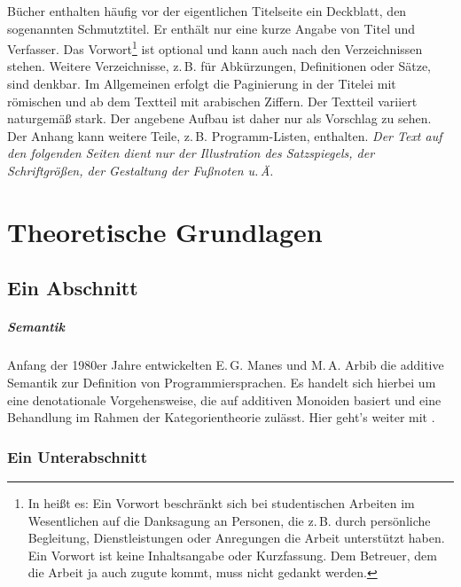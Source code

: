 \noindent
Bücher enthalten häufig vor der eigentlichen Titelseite ein Deckblatt,
den sogenannten Schmutztitel. Er enthält nur eine kurze Angabe von Titel
und Verfasser. Das Vorwort\footnote{In \cite{lit01} heißt es: \glqq{}Ein
Vorwort beschränkt sich bei studentischen Arbeiten im Wesentlichen auf
die Danksagung an Personen, die z.\,B. durch persönliche Begleitung,
Dienstleistungen oder Anregungen die Arbeit unterstützt haben. Ein Vorwort
ist keine Inhaltsangabe oder Kurzfassung. Dem Betreuer, dem die Arbeit ja
auch zugute kommt, muss nicht gedankt werden.\grqq} ist optional und kann
auch nach den Verzeichnissen stehen. Weitere Verzeichnisse, z.\,B. für
Abkürzungen, Definitionen oder Sätze, sind denkbar. Im Allgemeinen
erfolgt die Paginierung in der Titelei mit römischen und ab
dem Textteil mit arabischen Ziffern. Der Textteil variiert naturgemäß
stark. Der angebene Aufbau ist daher nur als Vorschlag zu sehen. Der
Anhang kann weitere Teile, z.\,B. Programm-Listen, enthalten.
\emph{Der Text auf den folgenden Seiten dient nur der Illustration
des Satzspiegels, der Schriftgrößen, der Gestaltung der Fußnoten u.\,Ä.}


\chapter{Theoretische Grundlagen}\label{Kapitel}

\section{Ein Abschnitt}\label{Sektion}

\paragraph{Semantik}\label{Paragraf}

Anfang der 1980er Jahre entwickelten E.\,G. Manes und M.\,A. Arbib die
additive Semantik zur Definition von Programmiersprachen. Es handelt
sich hierbei um eine denotationale Vorgehensweise, die auf additiven
Monoiden basiert und eine Behandlung im Rahmen der
Kategorientheorie zulässt. Hier geht's weiter mit \cite{lit01}.

\subsection{Ein Unterabschnitt}

